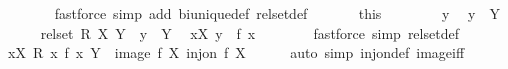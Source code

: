 \begin{isabellebody}
\ \ \ \ \ \ \isamarkupfalse%
\ {\isacharparenleft}{\kern0pt}fastforce\ simp\ add{\isacharcolon}{\kern0pt}\ bi{\isacharunderscore}{\kern0pt}unique{\isacharunderscore}{\kern0pt}def\ rel{\isacharunderscore}{\kern0pt}set{\isacharunderscore}{\kern0pt}def{\isacharparenright}{\kern0pt}{\isacharplus}{\kern0pt}\ \isacommand{{\isacharbraceright}{\kern0pt}}\isamarkupfalse%
\isanewline
\ \ \isamarkupfalse%
\ {\isacharasterisk}{\kern0pt}\ {\isacharequal}{\kern0pt}\ this\isanewline
\ \ \isamarkupfalse%
\isanewline
\ \ \isacommand{{\isacharbraceleft}{\kern0pt}}\isamarkupfalse%
\ \isamarkupfalse%
\ y\ \isamarkupfalse%
\ {\isachardoublequoteopen}y\ {\isasymin}\ Y{\isachardoublequoteclose}\isanewline
\ \ \ \ \isamarkupfalse%
\ {\isacartoucheopen}rel{\isacharunderscore}{\kern0pt}set\ R\ X\ Y{\isacartoucheclose}\ {\isacharasterisk}{\kern0pt}{\isacharparenleft}{\kern0pt}{}{\isacharparenright}{\kern0pt}\ {\isacartoucheopen}y\ {\isasymin}\ Y{\isacartoucheclose}\ \isamarkupfalse%
\ {\isachardoublequoteopen}{\isasymexists}x{\isasymin}X{\isachardot}{\kern0pt}\ y\ {\isacharequal}{\kern0pt}\ f\ x{\isachardoublequoteclose}\isanewline
\ \ \ \ \ \ \isamarkupfalse%
\ {\isacharparenleft}{\kern0pt}fastforce\ simp{\isacharcolon}{\kern0pt}\ rel{\isacharunderscore}{\kern0pt}set{\isacharunderscore}{\kern0pt}def{\isacharparenright}{\kern0pt}\ \isacommand{{\isacharbraceright}{\kern0pt}}\isamarkupfalse%
\isanewline
\ \ \isamarkupfalse%
\ \isamarkupfalse%
\ {\isachardoublequoteopen}{\isasymforall}x{\isasymin}X{\isachardot}{\kern0pt}\ R\ x\ {\isacharparenleft}{\kern0pt}f\ x{\isacharparenright}{\kern0pt}{\isachardoublequoteclose}\ {\isachardoublequoteopen}Y\ {\isacharequal}{\kern0pt}\ image\ f\ X{\isachardoublequoteclose}\ {\isachardoublequoteopen}inj{\isacharunderscore}{\kern0pt}on\ f\ X{\isachardoublequoteclose}\isanewline
\ \ \ \ \isamarkupfalse%
\ {\isacharparenleft}{\kern0pt}auto\ simp{\isacharcolon}{\kern0pt}\ inj{\isacharunderscore}{\kern0pt}on{\isacharunderscore}{\kern0pt}def\ image{\isacharunderscore}{\kern0pt}iff{\isacharparenright}{\kern0pt}\isanewline
{}\isamarkupfalse%
%
\endisatagproof
{\isafoldproof}%
%
\isadelimproof
%
\endisadelimproof
%
\isadelimdocument
%
\endisadelimdocument
%
\isatagdocument
%
\isamarkuptrue%
%
\endisatagdocument
{\isafolddocument}%
%
\isadelimdocument
%
\endisadelimdocument
{}\isamarkupfalse%

\end{isabellebody}
